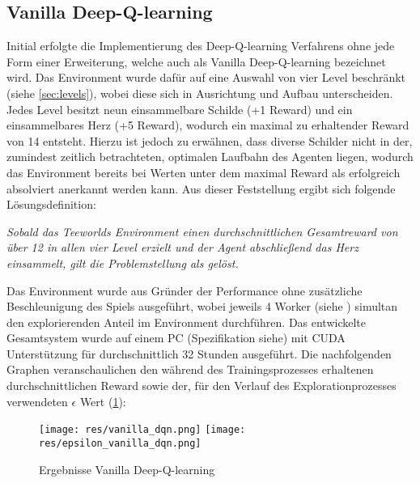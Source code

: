 \documentclass[11pt]{scrartcl}
\begin{document}

\subsection{Vanilla Deep-Q-learning}
Initial erfolgte die Implementierung des Deep-Q-learning Verfahrens ohne jede Form einer Erweiterung,
welche auch als Vanilla Deep-Q-learning bezeichnet wird. Das Environment wurde dafür auf eine Auswahl
von vier Level beschränkt (siehe \autoref{sec:levels}), wobei diese sich in Ausrichtung und Aufbau
unterscheiden. Jedes Level besitzt neun einsammelbare Schilde (+1 Reward) und ein einsammelbares
Herz (+5 Reward), wodurch ein maximal zu erhaltender Reward von 14 entsteht. Hierzu ist jedoch zu
erwähnen, dass diverse Schilder nicht in der, zumindest zeitlich betrachteten, optimalen Laufbahn
des Agenten liegen, wodurch das Environment bereits bei Werten unter dem maximal Reward als
erfolgreich absolviert anerkannt werden kann. Aus dieser Feststellung ergibt sich folgende
Lösungsdefinition:

\textit{Sobald das Teeworlds Environment einen durchschnittlichen Gesamtreward von über 12 in allen
vier Level erzielt und der Agent abschließend das Herz einsammelt, gilt die Problemstellung als 
gelöst.}

Das Environment wurde aus Gründer der Performance ohne zusätzliche Beschleunigung des Spiels
ausgeführt, wobei jeweils 4 Worker (siehe ) simultan den
explorierenden Anteil im Environment durchführen. Das entwickelte Gesamtsystem wurde auf einem
PC (Spezifikation siehe) %
mit CUDA Unterstützung für durchschnittlich 32 Stunden ausgeführt. Die nachfolgenden Graphen %
veranschaulichen den während des Trainingsprozesses erhaltenen durchschnittlichen Reward sowie
der, für den Verlauf des Explorationprozesses verwendeten $\epsilon$ Wert (\ref{fig:vanilla-dqn}):

\begin{figure}[htp]
\centering
\texttt{[image: res/vanilla\_dqn.png]}
\texttt{[image: res/epsilon\_vanilla\_dqn.png]}
\caption{Ergebnisse Vanilla Deep-Q-learning}
\label{fig:vanilla-dqn}
\end{figure}
\end{document}
